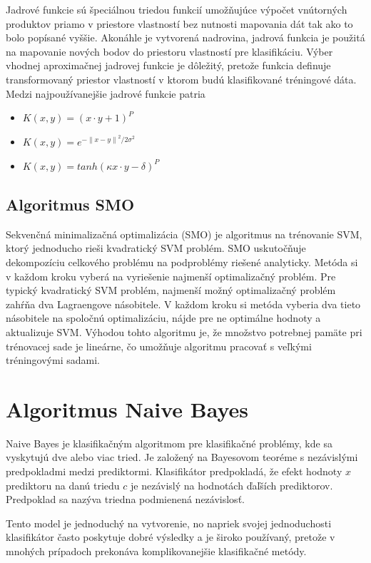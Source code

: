 Jadrové funkcie sú špeciálnou triedou funkcií umožňujúce výpočet vnútorných produktov priamo v priestore vlastností bez nutnosti mapovania dát tak ako to bolo popísané vyššie. 
Akonáhle je vytvorená nadrovina, jadrová funkcia je použitá na mapovanie nových bodov do priestoru vlastností pre klasifikáciu.
\newpage
Výber vhodnej aproximačnej jadrovej funkcie je dôležitý, pretože funkcia definuje transformovaný priestor vlastností v ktorom budú klasifikované tréningové dáta. Medzi najpoužívanejšie jadrové funkcie patria
\begin{itemize}
	\item $K(x,y) = (x \cdot y + 1)^{P}$
	\item $K(x,y) = e^{- {\parallel x - y \parallel}^{2}/ {2\sigma}^{2}}$
	\item $K(x,y) = tanh (\kappa x \cdot y -\delta)^{P}$
\end{itemize}


\subsection{Algoritmus SMO}

Sekvenčná minimalizačná optimalizácia (SMO) je algoritmus na trénovanie SVM, ktorý jednoducho rieši kvadratický SVM problém. SMO uskutočňuje dekompozíciu celkového problému na podproblémy riešené analyticky. Metóda si v každom kroku vyberá na vyriešenie najmenší optimalizačný problém. Pre typický kvadratický SVM problém, najmenší možný optimalizačný problém zahŕňa dva Lagraengove násobitele. V každom kroku si metóda vyberia dva tieto násobitele na spoločnú optimalizáciu, nájde pre ne optimálne hodnoty a aktualizuje SVM. Výhodou tohto algoritmu je, že množstvo potrebnej pamäte pri trénovacej sade je lineárne, čo umožňuje algoritmu pracovať s veľkými tréningovými sadami. 
 
\section{Algoritmus Naive Bayes}

Naive Bayes je klasifikačným algoritmom pre klasifikačné problémy, kde sa vyskytujú dve alebo viac tried. Je založený na Bayesovom teoréme s nezávislými predpokladmi medzi prediktormi. Klasifikátor predpokladá, že efekt hodnoty $x$ prediktoru na danú triedu $c$ je nezávislý na hodnotách ďaľších prediktorov. Predpoklad sa nazýva triedna podmienená nezávislosť. 

Tento model je jednoduchý na vytvorenie, no napriek svojej jednoduchosti klasifikátor často poskytuje dobré výsledky a je široko používaný, pretože v mnohých prípadoch prekonáva komplikovanejšie klasifikačné metódy.

